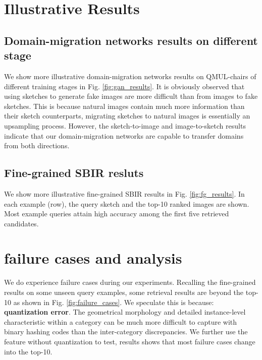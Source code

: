 \documentclass[runningheads]{llncs}
\begin{document}
 \section{Illustrative Results}
 \subsection{Domain-migration networks results on different stage}
 We show more illustrative domain-migration networks results on QMUL-chairs of different training stages in Fig. \ref{fig:gan_results}. 
 It is obviously observed that using sketches
to generate fake images are more difficult than from images to fake sketches. This is because natural images contain much more information than their sketch counterparts,
migrating sketches to natural images is essentially an upsampling process.
 However, the sketch-to-image and image-to-sketch results indicate 
 that our domain-migration networks are capable to transfer domains from both directions.  

 \subsection{Fine-grained SBIR resluts}
We show more illustrative fine-grained SBIR results in
Fig. \ref{fig:fg_results}.  In each example (row), the query
sketch and the top-10 ranked images are shown. Most example queries attain high accuracy among
the first five retrieved candidates.

 \section{failure cases and analysis}
 We do experience failure cases during our experiments. Recalling the fine-grained results
on some unseen query examples, some retrieval results are beyond the top-10 as shown in Fig. \ref{fig:failure_cases}.
We speculate this is because: \textbf{quantization error}. The geometrical morphology and
detailed instance-level characteristic within a category can be much more difficult 
to capture with binary hashing codes than the inter-category discrepancies. We further use the feature without quantization 
to test, results shows that most failure cases change into the top-10.
\end{document}
